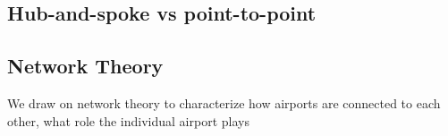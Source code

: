 \label{sec:theory}

\subsection{Hub-and-spoke vs point-to-point}


\subsection{Network Theory}
\label{subsec:Network Theory}
We draw on network theory to characterize how airports are connected to each other, what role the individual airport plays 



